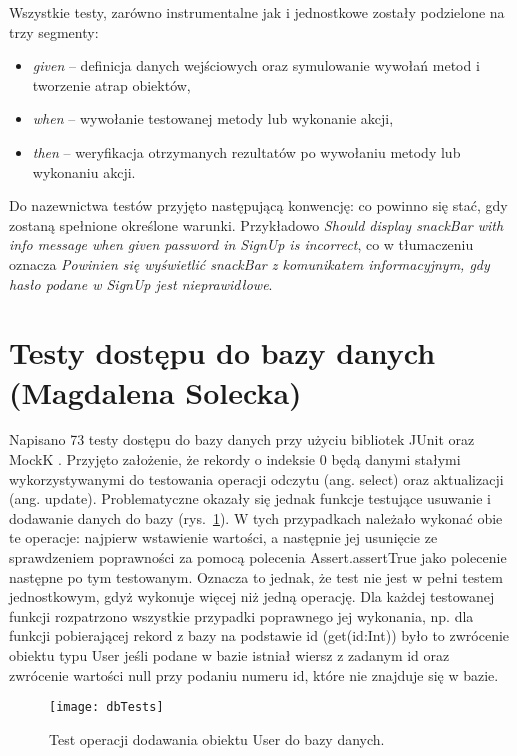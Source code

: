 \par Wszystkie testy, zarówno instrumentalne jak i jednostkowe zostały podzielone na trzy segmenty:
\begin{itemize}
\item \textit{given} -- definicja danych wejściowych oraz symulowanie wywołań metod i tworzenie atrap obiektów,
\item \textit{when} -- wywołanie testowanej metody lub wykonanie akcji,
\item \textit{then} -- weryfikacja otrzymanych rezultatów po wywołaniu metody lub wykonaniu akcji.
\end{itemize}
Do nazewnictwa testów przyjęto następującą konwencję: co powinno się stać, gdy zostaną spełnione określone warunki. Przykładowo \textit{Should display snackBar with info message when given password in SignUp is incorrect}, co w tłumaczeniu oznacza \textit{Powinien się wyświetlić snackBar z komunikatem informacyjnym, gdy hasło podane w SignUp jest nieprawidłowe}.

\FloatBarrier

\section{Testy dostępu do bazy danych (Magdalena Solecka)}
\par Napisano 73 testy dostępu do bazy danych przy użyciu bibliotek JUnit \cite{JUnit} oraz MockK \cite{MockK}. Przyjęto założenie, że rekordy o indeksie 0 będą danymi stałymi wykorzystywanymi do testowania operacji odczytu (ang. select) oraz aktualizacji (ang. update). Problematyczne okazały się jednak funkcje testujące usuwanie i dodawanie danych do bazy (rys.~\ref{fig:dbTests}). W tych przypadkach należało wykonać obie te operacje: najpierw wstawienie wartości, a następnie jej usunięcie ze sprawdzeniem poprawności za pomocą polecenia Assert.assertTrue jako polecenie następne po tym testowanym. Oznacza to jednak, że test nie jest w pełni testem jednostkowym, gdyż wykonuje więcej niż jedną operację. Dla każdej testowanej funkcji rozpatrzono wszystkie przypadki poprawnego jej wykonania, np. dla funkcji pobierającej rekord z bazy na podstawie id (get(id:Int)) było to zwrócenie obiektu typu User jeśli podane w bazie istniał wiersz z zadanym id oraz zwrócenie wartości null przy podaniu numeru id, które nie znajduje się w bazie. 

\begin{figure}[h]
\centering
\texttt{[image: dbTests]}
\caption{Test operacji dodawania obiektu User do bazy danych.}
\label{fig:dbTests}
\end{figure}
\FloatBarrier

